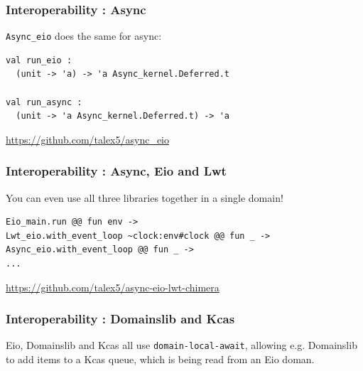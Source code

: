 \documentclass{beamer}
\begin{document}
\begin{frame}[fragile]
	\frametitle{Interoperability : Async}
	\verb|Async_eio| does the same for async:
	\bigskip
\begin{lstlisting}[style=ocaml]
val run_eio :
  (unit -> 'a) -> 'a Async_kernel.Deferred.t

val run_async :
  (unit -> 'a Async_kernel.Deferred.t) -> 'a
\end{lstlisting}
	\bigskip
	\url{https://github.com/talex5/async_eio}
\end{frame}

\begin{frame}[fragile]
	\frametitle{Interoperability : Async, Eio and Lwt}
	You can even use all three libraries together in a single domain!
	\bigskip
\begin{lstlisting}[style=ocaml]
Eio_main.run @@ fun env ->
Lwt_eio.with_event_loop ~clock:env#clock @@ fun _ ->
Async_eio.with_event_loop @@ fun _ ->
...
\end{lstlisting}
	\bigskip
	\url{https://github.com/talex5/async-eio-lwt-chimera}
\end{frame}

\begin{frame}[fragile]
	\frametitle{Interoperability : Domainslib and Kcas}
	Eio, Domainslib and Kcas all use \verb|domain-local-await|,
	allowing e.g. Domainslib to add items to a Kcas queue,
	which is being read from an Eio doman.
\end{frame}


\end{document}
